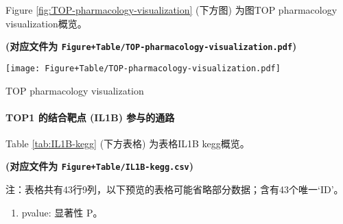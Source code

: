 \documentclass[
]{article}
\providecommand{\tightlist}{%
  \setlength{\itemsep}{0pt}\setlength{\parskip}{0pt}}
\begin{document}
Figure \ref{fig:TOP-pharmacology-visualization} (下方图) 为图TOP pharmacology visualization概览。

\textbf{(对应文件为 \texttt{Figure+Table/TOP-pharmacology-visualization.pdf})}

\def\@captype{figure}
\begin{center}
\texttt{[image: Figure+Table/TOP-pharmacology-visualization.pdf]}
\caption{TOP pharmacology visualization}\label{fig:TOP-pharmacology-visualization}
\end{center}

\hypertarget{top1-ux7684ux7ed3ux5408ux9776ux70b9-il1b-ux53c2ux4e0eux7684ux901aux8def}{%
\paragraph{TOP1 的结合靶点 (IL1B) 参与的通路}\label{top1-ux7684ux7ed3ux5408ux9776ux70b9-il1b-ux53c2ux4e0eux7684ux901aux8def}}

Table \ref{tab:IL1B-kegg} (下方表格) 为表格IL1B kegg概览。

\textbf{(对应文件为 \texttt{Figure+Table/IL1B-kegg.csv})}

\begin{center}\begin{tcolorbox}[colback=gray!10, colframe=gray!50, width=0.9\linewidth, arc=1mm, boxrule=0.5pt]注：表格共有43行9列，以下预览的表格可能省略部分数据；含有43个唯一`ID'。
\end{tcolorbox}
\end{center}
\begin{center}\begin{tcolorbox}[colback=gray!10, colframe=gray!50, width=0.9\linewidth, arc=1mm, boxrule=0.5pt]\begin{enumerate}\tightlist
\item pvalue:  显著性 P。
\end{enumerate}\end{tcolorbox}
\end{center}
\end{document}
